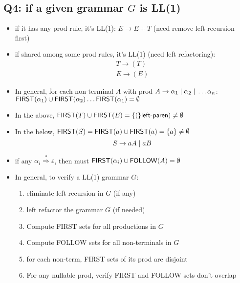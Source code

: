\documentclass[10pt,a4paper,landscape]{article}
\begin{document}
\begin{multicols*}{3}
\section*{Q4: if a given grammar $G$ is LL(1)}
\begin{itemize}
\item if it has any  prod rule, it's  LL(1): $E\to E+ T$ (need remove left-recursion first)
\item if  shared among some prod rules, it's  LL(1) (need left refactoring):
  \begin{align*}
    T\to (T) \\
    E\to (E)
  \end{align*}
\item In general, for each non-terminal $A$ with prod $A\to \alpha_1\;|\; \alpha_2\;|\;\ldots\alpha_n$: $\mfn{first}(\alpha_1)\cup\mfn{first}(\alpha_2)\ldots\mfn{first}(\alpha_1) = \emptyset$
\item In the above, $\mfn{first}(T)\cup\mfn{first}(E) = \mset(\textsf{left-paren})\neq \emptyset$
\item In the below, $\mfn{first}(S)=\mfn{first}(a)\cup\mfn{first}(a)=\mset{a}\neq\emptyset$
  \[
    S\to aA \;|\; aB
  \]
\item if any $\alpha_i \overset{*}{\Rightarrow} \varepsilon$, then must $\mfn{first}(\alpha_i)\cup\mfn{follow}(A)=\emptyset$
\item In general, to verify a LL(1) grammar $G$:
  \begin{enumerate}
  \item eliminate left recursion in $G$ (if any)
  \item left refactor the grammar $G$ (if needed)
  \item Compute FIRST sets for all productions in $G$
  \item Compute FOLLOW sets for all non-terminals in $G$
  \item for each non-term, FIRST sets of its prod are disjoint
  \item For any nullable prod, verify FIRST and FOLLOW sets don't overlap
  \end{enumerate}
\end{itemize}

\end{multicols*}
\end{document}

